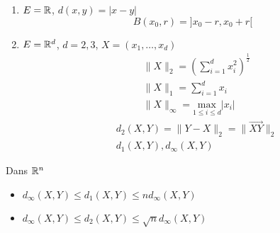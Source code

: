 \begin{eg}
   \begin{enumerate}
       \item $E = \mathbb{R}$, \quad  $d(x, y) = |x - y|$
            \[
                B(x_0, r) = ]x_0 -r, x_0 + r[
           \] 
       \item $E = \mathbb{R}^d$, \quad $d = 2,3$, \quad $X = (x_1, \ldots, x_d)$ 
           \begin{align*}
               &\|X\|_2 = \left( \sum_{i=1}^{d} x_i^2 \right)^{\frac{1}{2}} \\
               &\|X\|_1 = \sum_{i=1}^{d} x_i\\
               &\|X\|_{\infty} = \underset{1 \le i \le d}{\text{max}}|x_i|
           \end{align*}
           \begin{align*}
              &d_2(X, Y) = \|Y - X\|_2 = \|\vec{XY}\|_2\\ 
              &d_1(X, Y), d_{\infty}(X, Y)
           \end{align*}
   \end{enumerate} 
\end{eg}
\begin{property} Dans $\mathbb{R}^n$
   \begin{itemize}
       \item $d_{\infty}(X, Y) \le d_1(X, Y) \le n d_{\infty}(X, Y)$
       \item $d_{\infty}(X, Y) \le d_2(X, Y) \le \sqrt{n} d_{\infty}(X, Y)$
   \end{itemize} 
\end{property}
